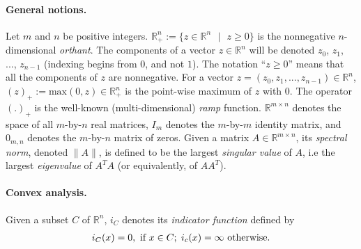 \documentclass[envcountsame]{llcns2e/llncs}
\begin{document}
\paragraph{\textbf{General notions.}}
Let $m$ and $n$ be positive integers.
$\mathbb{R}^{n}_+ := \{z \in \mathbb{R}^{n}\text{ }|\text{ } z \geq
0\}$ is the nonnegative $n$-dimensional \textit{orthant}.  The
components of a vector $z \in \mathbb{R}^n$ will be denoted $z_0$,
$z_1$, ..., $z_{n-1}$ (indexing begins from $0$, and not $1$). The
notation ``$z \ge 0$'' means that all the components of $z$ are
nonnegative. For a vector $z = (z_0, z_1, ..., z_{n-1}) \in
\mathbb{R}^n$, %
$(z)_+:=\text{max}(0, z) \in \mathbb{R}^{n}_+$ is the point-wise
maximum of $z$ with $0$.
The operator $(.)_+$ is the well-known
(multi-dimensional) \textit{ramp} function.
$\mathbb{R}^{m \times n}$ denotes the space of all $m$-by-$n$ real
matrices, $I_m$ denotes the $m$-by-$m$ identity matrix, and $0_{m,n}$
denotes the $m$-by-$n$ matrix of zeros.
Given a matrix $A \in \mathbb{R}^{m \times n}$, its \textit{spectral
  norm}, denoted $\|A\|$, is
 defined to be the largest \textit{singular value} of $A$, i.e the
 largest \textit{eigenvalue} of $A^TA$ (or equivalently, of $AA^T$).

\paragraph{\textbf{Convex analysis.}}
Given a subset $C$ of $\mathbb{R}^n$,
$i_C$ denotes its \textit{indicator function} defined by
\begin{eqnarray}
  i_C(x) = 0, \text{ if } x \in C;\hspace{.3em} i_c(x) = \infty\text{
    otherwise.}
\end{eqnarray}
\end{document}
